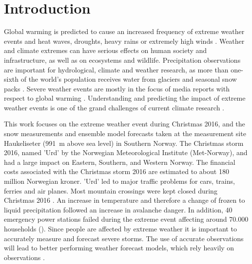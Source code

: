 \chapter{Introduction}
\label{ch:intro}
Global warming is predicted to cause an increased frequency of extreme weather events and heat waves, droughts, heavy rains or extremely high winds \citep{hansen_warmer_2014}. Weather and climate extremes can have serious effects on human society and infrastructure, as well as on ecosystems and wildlife.
Precipitation observations are important for hydrological, climate and weather research, as more than one-sixth of the world's population receives water from glaciers and seasonal snow packs \citep{barnett_potential_2005}. Severe weather events are mostly in the focus of media reports with respect to global warming \citep{meehl_introduction_2000}. Understanding and predicting the impact of extreme weather events is one of the grand challenges of current climate research \citep{stocker_working_2013,field_summary_2014}.
\par\medskip
\noindent
This work focuses on the extreme weather event during Christmas 2016, and the snow measurements and ensemble model forecasts taken at the measurement site Haukeliseter (\SI{991}{\metre} above sea level) in Southern Norway. The Christmas storm 2016, named 'Urd' by the Norwegian Meteorological Institute (Met-Norway), and had a large impact on Eastern, Southern, and Western Norway.  %
The financial costs associated with the Christmas storm 2016 are estimated to about 180 million Norwegian kroner. 'Urd' led to major traffic problems for cars, trains, ferries and air planes. Most mountain crossings were kept closed during Christmas 2016 \citep{olsen_ekstremvaerrapport._2017}. An increase in temperature and therefore a change of frozen to liquid precipitation followed an increase in avalanche danger. In addition, 40 emergency power stations failed during the extreme event affecting around 70.000 households ().
Since people are affected by extreme weather it is important to accurately measure and forecast severe storms. The use of accurate observations will lead to better performing weather forecast models, which rely heavily on observations \citep{joos_influence_2012}. 
